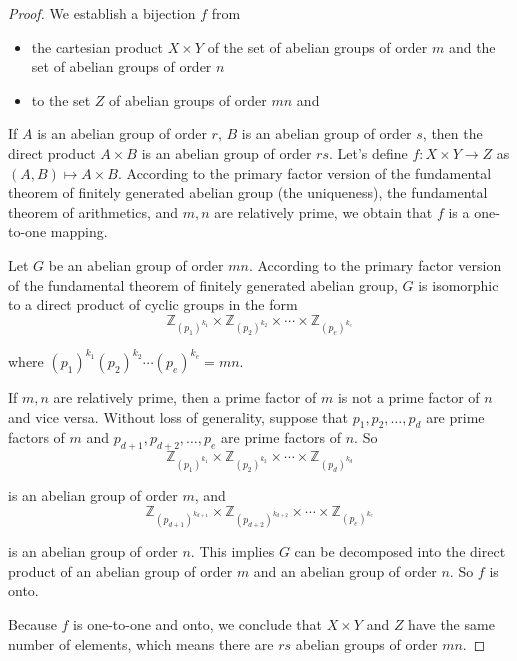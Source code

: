 \begin{proof}
    We establish a bijection $f$ from
    \begin{itemize}
        \item the cartesian product $X\times Y$ of the set of abelian groups of order $m$ and the set of abelian groups of order $n$
        \item to the set $Z$ of abelian groups of order $mn$ and
    \end{itemize}

    If $A$ is an abelian group of order $r$, $B$ is an abelian group of order $s$, then the direct product $A\times B$ is an abelian group of order $rs$. Let's define $f: X\times Y \to Z$ as $(A, B) \mapsto A\times B$. According to the primary factor version of the fundamental theorem of finitely generated abelian group (the uniqueness), the fundamental theorem of arithmetics, and $m, n$ are relatively prime, we obtain that $f$ is a one-to-one mapping.

    Let $G$ be an abelian group of order $mn$. According to the primary factor version of the fundamental theorem of finitely generated abelian group, $G$ is isomorphic to a direct product of cyclic groups in the form
    \[
        \mathbb{Z}_{{(p_{1})}^{k_{1}}} \times \mathbb{Z}_{{(p_{2})}^{k_{2}}} \times \cdots \times \mathbb{Z}_{{(p_{e})}^{k_{e}}}
    \]

    where ${(p_{1})}^{k_{1}}{(p_{2})}^{k_{2}}\cdots {(p_{e})}^{k_{e}} = mn$.

    If $m, n$ are relatively prime, then a prime factor of $m$ is not a prime factor of $n$ and vice versa. Without loss of generality, suppose that $p_{1}, p_{2}, \ldots, p_{d}$ are prime factors of $m$ and $p_{d+1}, p_{d+2}, \ldots, p_{e}$ are prime factors of $n$. So
    \[
        \mathbb{Z}_{{(p_{1})}^{k_{1}}} \times \mathbb{Z}_{{(p_{2})}^{k_{2}}} \times \cdots \times \mathbb{Z}_{{(p_{d})}^{k_{d}}}
    \]

    is an abelian group of order $m$, and
    \[
        \mathbb{Z}_{{(p_{d+1})}^{k_{d+1}}} \times \mathbb{Z}_{{(p_{d+2})}^{k_{d+2}}} \times \cdots \times \mathbb{Z}_{{(p_{e})}^{k_{e}}}
    \]

    is an abelian group of order $n$. This implies $G$ can be decomposed into the direct product of an abelian group of order $m$ and an abelian group of order $n$. So $f$ is onto.

    Because $f$ is one-to-one and onto, we conclude that $X\times Y$ and $Z$ have the same number of elements, which means there are $rs$ abelian groups of order $mn$.
\end{proof}

